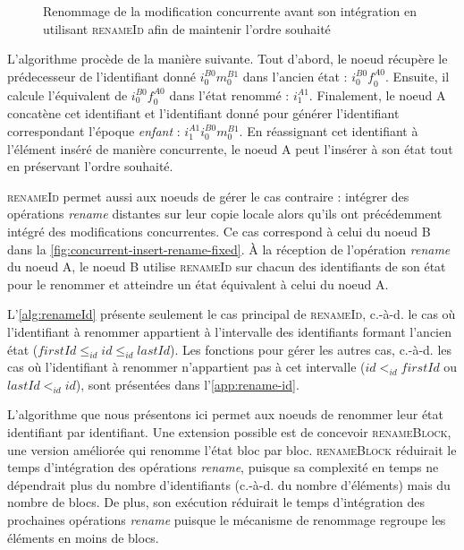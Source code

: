 \documentclass[12pt]{thesul}
\newcommand{\ie}{c.-à-d. }
\newcommand{\trm}[1]{\mathit{#1}}
\newcommand{\id}[3]{$\trm{#1}^{\trm{#2}}_{\trm{#3}}$}
\begin{document}
\begin{figure}[!ht]
{\begin{tikzpicture}
    \end{tikzpicture}
  }
  \caption{Renommage de la modification concurrente avant son intégration en utilisant \textsc{renameId} afin de maintenir l'ordre souhaité}
  \label{fig:concurrent-insert-rename-fixed}
\end{figure}

L'algorithme procède de la manière suivante.
Tout d'abord, le noeud récupère le prédecesseur de l'identifiant donné \id{i}{B0}{0}\id{m}{B1}{0} dans l'ancien état : \id{i}{B0}{0}\id{f}{A0}{0}.
Ensuite, il calcule l'équivalent de \id{i}{B0}{0}\id{f}{A0}{0} dans l'état renommé : \id{i}{A1}{1}.
Finalement, le noeud A concatène cet identifiant et l'identifiant donné pour générer l'identifiant correspondant l'époque \emph{enfant} : \id{i}{A1}{1}\id{i}{B0}{0}\id{m}{B1}{0}.
En réassignant cet identifiant à l'élément inséré de manière concurrente, le noeud A peut l'insérer à son état tout en préservant l'ordre souhaité.

\textsc{renameId} permet aussi aux noeuds de gérer le cas contraire : intégrer des opérations \emph{rename} distantes sur leur copie locale alors qu'ils ont précédemment intégré des modifications concurrentes.
Ce cas correspond à celui du noeud B dans la \autoref{fig:concurrent-insert-rename-fixed}.
À la réception de l'opération \emph{rename} du noeud A, le noeud B utilise \textsc{renameId} sur chacun des identifiants de son état pour le renommer et atteindre un état équivalent à celui du noeud A.

L'\autoref{alg:renameId} présente seulement le cas principal de \textsc{renameId}, \ie le cas où l'identifiant à renommer appartient à l'intervalle des identifiants formant l'ancien état ($\trm{firstId} \leq_{id} \trm{id} \leq_{id} \trm{lastId}$).
Les fonctions pour gérer les autres cas, \ie les cas où l'identifiant à renommer n'appartient pas à cet intervalle ($\trm{id} <_{id} \trm{firstId}$ ou $\trm{lastId} <_{id} \trm{id}$), sont présentées dans l'\autoref{app:rename-id}.

L'algorithme que nous présentons ici permet aux noeuds de renommer leur état identifiant par identifiant.
Une extension possible est de concevoir \textsc{renameBlock}, une version améliorée qui renomme l'état bloc par bloc.
\textsc{renameBlock} réduirait le temps d'intégration des opérations \emph{rename}, puisque sa complexité en temps ne dépendrait plus du nombre d'identifiants (\ie du nombre d'éléments) mais du nombre de blocs.
De plus, son exécution réduirait le temps d'intégration des prochaines opérations \emph{rename} puisque le mécanisme de renommage regroupe les éléments en moins de blocs.
\end{document}

